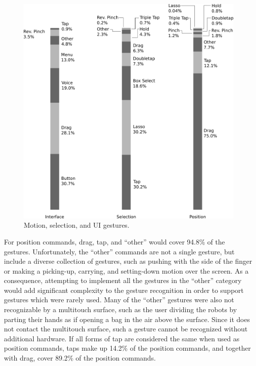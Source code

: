 \begin{figure}
	\centering
	\includegraphics[width=\linewidth]{../thin_grey_text.png}
	\caption{Motion, selection, and UI gestures.}
	\label{fig:select_ui_move_breakdown}
\end{figure}



 

 

 

For position commands, drag, tap, and ``other'' would cover 94.8\% of the gestures. 
Unfortunately, the ``other'' commands are not a single gesture, but include a diverse collection of gestures, such as pushing with the side of the finger or making a picking-up, carrying, and setting-down motion over the screen.
As a consequence, attempting to implement all the gestures in the ``other'' category would add significant complexity to the gesture recognition in order to support gestures which were rarely used. 
Many of the ``other'' gestures were also not recognizable by a multitouch surface, such as the user dividing the robots by parting their hands as if opening a bag in the air above the surface. 
Since it does not contact the multitouch surface, such a gesture cannot be recognized without additional hardware. 
If all forms of tap are considered the same when used as position commands, taps make up 14.2\% of the position commands, and together with drag, cover 89.2\% of the position commands. 


